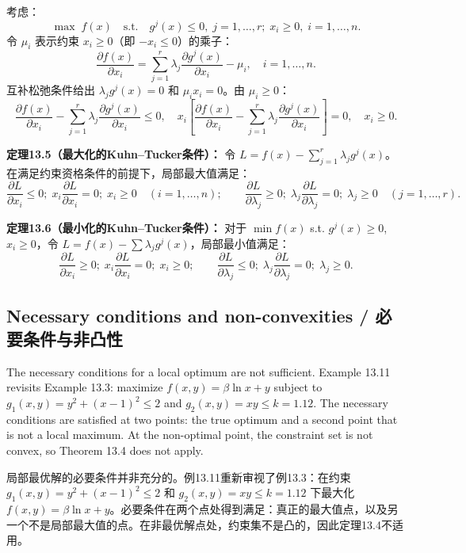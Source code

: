 \begin{translation}
考虑：
\[
\max \; f(x) \quad \text{s.t.} \quad g^j(x) \le 0,\; j = 1,\dots, r;\; x_i \ge 0,\; i = 1,\dots, n. \tag{13.11}
\]
令 $\mu_i$ 表示约束 $x_i \ge 0$（即 $-x_i \le 0$）的乘子：
\[
\frac{\partial f(x)}{\partial x_i} = \sum_{j=1}^r \lambda_j \frac{\partial g^j(x)}{\partial x_i} - \mu_i, \quad i = 1,\dots, n. \tag{13.14}
\]
互补松弛条件给出 $\lambda_j g^j(x) = 0$ 和 $\mu_i x_i = 0$。由 $\mu_i \ge 0$：
\[
\frac{\partial f(x)}{\partial x_i} - \sum_{j=1}^r \lambda_j \frac{\partial g^j(x)}{\partial x_i} \le 0, \quad x_i\left[\frac{\partial f(x)}{\partial x_i} - \sum_{j=1}^r \lambda_j \frac{\partial g^j(x)}{\partial x_i}\right] = 0, \quad x_i \ge 0. \tag{13.15}
\]

\textbf{定理13.5（最大化的Kuhn--Tucker条件）：} 令 $L = f(x) - \sum_{j=1}^r \lambda_j g^j(x)$。在满足约束资格条件的前提下，局部最大值满足：
\[
\frac{\partial L}{\partial x_i} \le 0;\; x_i \frac{\partial L}{\partial x_i} = 0;\; x_i \ge 0 \quad (i = 1,\dots,n); \qquad
\frac{\partial L}{\partial \lambda_j} \ge 0;\; \lambda_j \frac{\partial L}{\partial \lambda_j} = 0;\; \lambda_j \ge 0 \quad (j = 1,\dots,r). \tag{13.18}
\]

\textbf{定理13.6（最小化的Kuhn--Tucker条件）：} 对于 $\min f(x)$ s.t. $g^j(x) \ge 0$, $x_i \ge 0$，令 $L = f(x) - \sum \lambda_j g^j(x)$，局部最小值满足：
\[
\frac{\partial L}{\partial x_i} \ge 0;\; x_i \frac{\partial L}{\partial x_i} = 0;\; x_i \ge 0; \qquad
\frac{\partial L}{\partial \lambda_j} \le 0;\; \lambda_j \frac{\partial L}{\partial \lambda_j} = 0;\; \lambda_j \ge 0. \tag{13.22}
\]
\end{translation}

\subsection{Necessary conditions and non-convexities / 必要条件与非凸性}

\begin{original}
The necessary conditions for a local optimum are not sufficient. Example 13.11 revisits Example 13.3: maximize $f(x, y) = \beta \ln x + y$ subject to $g_1(x, y) = y^2 + (x-1)^2 \le 2$ and $g_2(x, y) = xy \le k = 1.12$. The necessary conditions are satisfied at two points: the true optimum and a second point that is not a local maximum. At the non-optimal point, the constraint set is not convex, so Theorem 13.4 does not apply.
\end{original}
\begin{translation}
局部最优解的必要条件并非充分的。例13.11重新审视了例13.3：在约束 $g_1(x, y) = y^2 + (x-1)^2 \le 2$ 和 $g_2(x, y) = xy \le k = 1.12$ 下最大化 $f(x, y) = \beta \ln x + y$。必要条件在两个点处得到满足：真正的最大值点，以及另一个不是局部最大值的点。在非最优解点处，约束集不是凸的，因此定理13.4不适用。
\end{translation}

